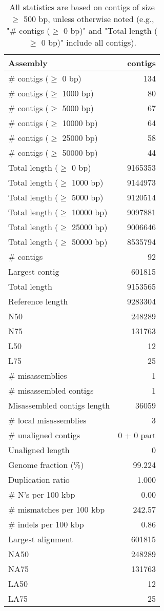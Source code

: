 \documentclass[12pt,a4paper]{article}
\begin{document}
\begin{table}[ht]
\begin{center}
\caption{All statistics are based on contigs of size $\geq$ 500 bp, unless otherwise noted (e.g., "\# contigs ($\geq$ 0 bp)" and "Total length ($\geq$ 0 bp)" include all contigs).}
\begin{tabular}{|l*{1}{|r}|}
\hline
Assembly & contigs \\ \hline
\# contigs ($\geq$ 0 bp) & 134 \\ \hline
\# contigs ($\geq$ 1000 bp) & 80 \\ \hline
\# contigs ($\geq$ 5000 bp) & 67 \\ \hline
\# contigs ($\geq$ 10000 bp) & 64 \\ \hline
\# contigs ($\geq$ 25000 bp) & 58 \\ \hline
\# contigs ($\geq$ 50000 bp) & 44 \\ \hline
Total length ($\geq$ 0 bp) & 9165353 \\ \hline
Total length ($\geq$ 1000 bp) & 9144973 \\ \hline
Total length ($\geq$ 5000 bp) & 9120514 \\ \hline
Total length ($\geq$ 10000 bp) & 9097881 \\ \hline
Total length ($\geq$ 25000 bp) & 9006646 \\ \hline
Total length ($\geq$ 50000 bp) & 8535794 \\ \hline
\# contigs & 92 \\ \hline
Largest contig & 601815 \\ \hline
Total length & 9153565 \\ \hline
Reference length & 9283304 \\ \hline
N50 & 248289 \\ \hline
N75 & 131763 \\ \hline
L50 & 12 \\ \hline
L75 & 25 \\ \hline
\# misassemblies & 1 \\ \hline
\# misassembled contigs & 1 \\ \hline
Misassembled contigs length & 36059 \\ \hline
\# local misassemblies & 3 \\ \hline
\# unaligned contigs & 0 + 0 part \\ \hline
Unaligned length & 0 \\ \hline
Genome fraction (\%) & 99.224 \\ \hline
Duplication ratio & 1.000 \\ \hline
\# N's per 100 kbp & 0.00 \\ \hline
\# mismatches per 100 kbp & 242.57 \\ \hline
\# indels per 100 kbp & 0.86 \\ \hline
Largest alignment & 601815 \\ \hline
NA50 & 248289 \\ \hline
NA75 & 131763 \\ \hline
LA50 & 12 \\ \hline
LA75 & 25 \\ \hline
\end{tabular}
\end{center}
\end{table}
\end{document}
